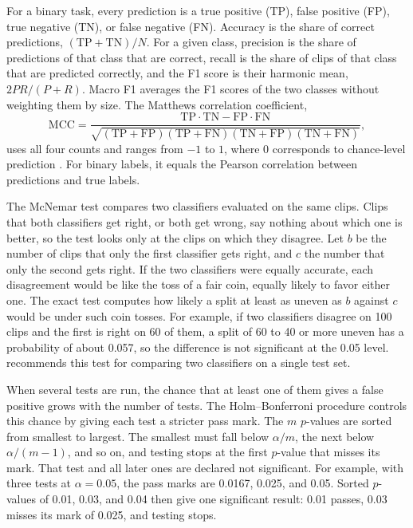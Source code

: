 For a binary task, every prediction is a true positive (TP), false positive (FP), true negative (TN), or false negative (FN). Accuracy is the share of correct predictions, $(\mathrm{TP} + \mathrm{TN}) / N$. For a given class, precision is the share of predictions of that class that are correct, recall is the share of clips of that class that are predicted correctly, and the F1 score is their harmonic mean, $2PR/(P + R)$. Macro F1 averages the F1 scores of the two classes without weighting them by size. The Matthews correlation coefficient,
\begin{equation}
   \mathrm{MCC} = \frac{\mathrm{TP} \cdot \mathrm{TN} - \mathrm{FP} \cdot \mathrm{FN}}{\sqrt{(\mathrm{TP}+\mathrm{FP})(\mathrm{TP}+\mathrm{FN})(\mathrm{TN}+\mathrm{FP})(\mathrm{TN}+\mathrm{FN})}},
   \label{eq:mcc}
\end{equation}
uses all four counts and ranges from $-1$ to $1$, where 0 corresponds to chance-level prediction \cite{chicco2020}. For binary labels, it equals the Pearson correlation between predictions and true labels.

The McNemar test \cite{mcnemar1947} compares two classifiers evaluated on the same clips. Clips that both classifiers get right, or both get wrong, say nothing about which one is better, so the test looks only at the clips on which they disagree. Let $b$ be the number of clips that only the first classifier gets right, and $c$ the number that only the second gets right. If the two classifiers were equally accurate, each disagreement would be like the toss of a fair coin, equally likely to favor either one. The exact test computes how likely a split at least as uneven as $b$ against $c$ would be under such coin tosses. For example, if two classifiers disagree on 100 clips and the first is right on 60 of them, a split of 60 to 40 or more uneven has a probability of about 0.057, so the difference is not significant at the 0.05 level.  recommends this test for comparing two classifiers on a single test set.

When several tests are run, the chance that at least one of them gives a false positive grows with the number of tests. The Holm--Bonferroni procedure \cite{holm1979} controls this chance by giving each test a stricter pass mark. The $m$ $p$-values are sorted from smallest to largest. The smallest must fall below $\alpha / m$, the next below $\alpha / (m - 1)$, and so on, and testing stops at the first $p$-value that misses its mark. That test and all later ones are declared not significant. For example, with three tests at $\alpha = 0.05$, the pass marks are 0.0167, 0.025, and 0.05. Sorted $p$-values of 0.01, 0.03, and 0.04 then give one significant result: 0.01 passes, 0.03 misses its mark of 0.025, and testing stops.

